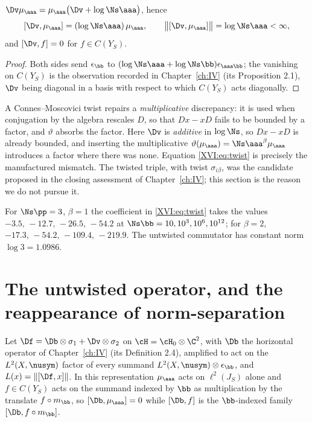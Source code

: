 \begin{proposition}\label{XVI:prop:bounded}
$\Dv\mu_\aaa=\mu_\aaa\bigl(\Dv+\log\Ns\aaa\bigr)$, hence
\[
[\Dv,\mu_\aaa]=(\log\Ns\aaa)\,\mu_\aaa,\qquad \bigl\|[\Dv,\mu_\aaa]\bigr\|=\log\Ns\aaa<\infty,
\]
and $[\Dv,f]=0$ for $f\in C(Y_S)$.
\end{proposition}

\begin{proof}
Both sides send $\epsilon_\bb$ to $(\log\Ns\aaa+\log\Ns\bb)\epsilon_{\aaa\bb}$; the vanishing
on $C(Y_S)$ is the observation recorded in Chapter~\ref{ch:IV} (its Proposition 2.1),
$\Dv$ being diagonal in a basis with respect to which $C(Y_S)$ acts diagonally.
\end{proof}

\begin{remark}\label{XVI:rem:whybackfire}
A Connes--Moscovici twist \cite{ConnesMoscovici} repairs a \emph{multiplicative} discrepancy: it is used when
conjugation by the algebra rescales $D$, so that $Dx-xD$ fails to be bounded by a factor,
and $\vartheta$ absorbs the factor. Here $\Dv$ is \emph{additive} in $\log\Ns$, so
$Dx-xD$ is already bounded, and inserting the multiplicative $\vartheta(\mu_\aaa)=\Ns\aaa^\beta\mu_\aaa$
introduces a factor where there was none. Equation \eqref{XVI:eq:twist} is precisely the
manufactured mismatch. The twisted triple, with twist $\sigma_{i\beta}$, was the candidate
proposed in the closing assessment of Chapter~\ref{ch:IV}; this section is the reason we do not pursue
it.
\end{remark}

\begin{remark}\label{XVI:rem:numtwist}
For $\Ns\pp=3$, $\beta=1$ the coefficient in \eqref{XVI:eq:twist} takes the values
$-3.5,\,-12.7,\,-26.5,\,-54.2$ at $\Ns\bb=10,10^3,10^6,10^{12}$; for $\beta=2$,
$-17.3,\,-54.2,\,-109.4,\,-219.9$. The untwisted commutator has constant norm
$\log3=1.0986$.
\end{remark}

\section{The untwisted operator, and the reappearance of norm-separation}

Let $\Df=\Db\otimes\sigma_1+\Dv\otimes\sigma_2$ on $\cH=\cH_0\otimes\C^2$, with $\Db$ the
horizontal operator of Chapter~\ref{ch:IV} (its Definition 2.4), amplified to act on the
$L^2(X,\nusym)$ factor of every summand $L^2(X,\nusym)\otimes\epsilon_\bb$, and
$L(x)=\|[\Df,x]\|$. In this representation $\mu_\aaa$ acts on $\ell^2(J_S)$ alone and $f\in
C(Y_S)$ acts on the summand indexed by $\bb$ as multiplication by the translate
$f\circ m_\bb$, so $[\Db,\mu_\aaa]=0$ while $[\Db,f]$ is the $\bb$-indexed family
$[\Db,f\circ m_\bb]$.

